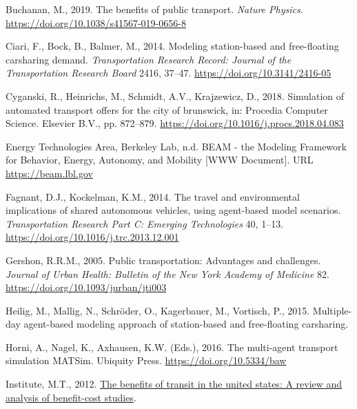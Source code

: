 \documentclass[
]{article}
\newlength{\cslhangindent}
\newlength{\cslentryspacingunit} %
\newenvironment{CSLReferences}[2] %
 {%
  \setlength{\parindent}{0pt}
  \ifodd #1
  \let\oldpar\par
  \def\par{\hangindent=\cslhangindent\oldpar}
  \fi
  \setlength{\parskip}{#2\cslentryspacingunit}
 }%
 {}
\begin{document}
\begin{CSLReferences}{1}{0}
\leavevmode{}%
Buchanan, M., 2019. The benefits of public transport. \emph{Nature Physics}. \url{https://doi.org/10.1038/s41567-019-0656-8}

\leavevmode{}%
Ciari, F., Bock, B., Balmer, M., 2014. Modeling station-based and free-floating carsharing demand. \emph{Transportation Research Record: Journal of the Transportation Research Board} 2416, 37--47. \url{https://doi.org/10.3141/2416-05}

\leavevmode{}%
Cyganski, R., Heinrichs, M., Schmidt, A.V., Krajzewicz, D., 2018. Simulation of automated transport offers for the city of brunswick, in: Procedia Computer Science. Elsevier B.V., pp. 872--879. \url{https://doi.org/10.1016/j.procs.2018.04.083}

\leavevmode{}%
Energy Technologies Area, Berkeley Lab, n.d. {BEAM - the Modeling Framework for Behavior, Energy, Autonomy, and Mobility} {[}WWW Document{]}. URL \url{https://beam.lbl.gov}

\leavevmode{}%
Fagnant, D.J., Kockelman, K.M., 2014. The travel and environmental implications of shared autonomous vehicles, using agent-based model scenarios. \emph{Transportation Research Part C: Emerging Technologies} 40, 1--13. \url{https://doi.org/10.1016/j.trc.2013.12.001}

\leavevmode{}%
Gershon, R.R.M., 2005. Public transportation: Advantages and challenges. \emph{Journal of Urban Health: Bulletin of the New York Academy of Medicine} 82. \url{https://doi.org/10.1093/jurban/jti003}

\leavevmode{}%
Heilig, M., Mallig, N., Schröder, O., Kagerbauer, M., Vortisch, P., 2015. Multiple-day agent-based modeling approach of station-based and free-floating carsharing.

\leavevmode{}%
Horni, A., Nagel, K., Axhausen, K.W. (Eds.), 2016. The multi-agent transport simulation MATSim. Ubiquity Press. \url{https://doi.org/10.5334/baw}

\leavevmode{}%
Institute, M.T., 2012. \href{http://transweb.sjsu.edu}{The benefits of transit in the united states: A review and analysis of benefit-cost studies}.


\end{CSLReferences}
\end{document}
